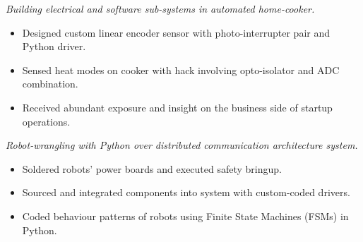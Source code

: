 \documentclass{resume}
\begin{document}
\textit{Building electrical and software sub-systems in automated home-cooker.}
\begin{itemize}
  \item Designed custom linear encoder sensor with photo-interrupter pair and Python driver.
  \item Sensed heat modes on cooker with hack involving opto-isolator and ADC combination.
  \item Received abundant exposure and insight on the business side of startup operations.
\end{itemize}

\textit{Robot-wrangling with Python over distributed communication architecture system.}
\begin{itemize}
  \item Soldered robots' power boards and executed safety bringup.
  \item Sourced and integrated components into system with custom-coded drivers.
  \item Coded behaviour patterns of robots using Finite State Machines (FSMs) in Python.
\end{itemize}
\end{document}
